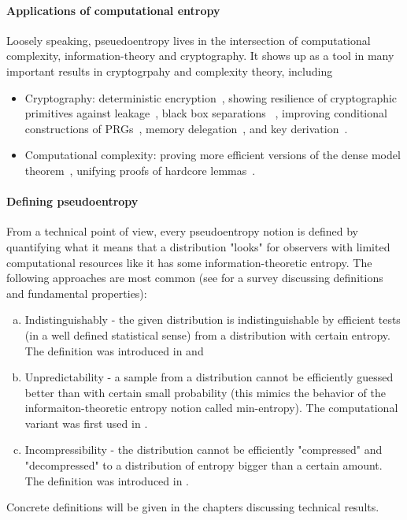 \documentclass[12pt]{report}
\begin{document}
\paragraph{Applications of computational entropy}
Loosely speaking, pseuedoentropy lives in the intersection of computational complexity, information-theory and cryptography. It shows up as a tool in many important results in cryptogrpahy and complexity theory, including
\begin{itemize}
\item Cryptography: deterministic encryption~\cite{DBLP:conf/tcc/FullerOR12},
showing resilience of cryptographic primitives against leakage~\cite{DBLP:conf/focs/DziembowskiP08,DBLP:conf/eurocrypt/Pietrzak09}, black box separations
~\cite{DBLP:conf/stoc/GentryW11}, improving conditional constructions of PRGs~\cite{DBLP:conf/stoc/VadhanZ12},
 memory delegation~\cite{DBLP:conf/crypto/ChungKLR11}, and key derivation~\cite{DBLP:conf/icalp/SkorskiGP15}.
\item Computational complexity: proving more efficient versions of the dense model theorem~\cite{DBLP:conf/focs/ReingoldTTV08,DBLP:journals/eccc/Zhang11}, unifying proofs
of hardcore lemmas~\cite{DBLP:conf/icits/Skorski15a}.
\end{itemize}
 

\paragraph{Defining pseudoentropy}
From a technical point of view, every pseudoentropy notion is defined by quantifying what it means that
a distribution "looks" for observers with limited computational resources like it has some information-theoretic entropy.
The following approaches are most common (see \cite{DBLP:conf/icits/Reyzin11} for a survey discussing definitions and fundamental properties):
\begin{enumerate}[(a)]
    \item Indistinguishably - the given distribution is indistinguishable by efficient tests
    (in a well defined statistical sense) from a distribution with certain entropy. The definition was introduced in \cite{DBLP:journals/siamcomp/HastadILL99} and \cite{DBLP:conf/random/BarakSW03}
    \item Unpredictability - a sample from a distribution cannot be efficiently guessed
    better than with certain small probability (this mimics the behavior of the informaiton-theoretic entropy notion called min-entropy). The computational variant was first used in \cite{DBLP:conf/eurocrypt/HsiaoLR07}.
   \item Incompressibility - the distribution cannot be efficiently "compressed" and "decompressed" to a distribution of 
   entropy bigger than a certain amount. The definition was introduced in \cite{DBLP:conf/random/BarakSW03}.
\end{enumerate}
Concrete definitions will be given in the chapters discussing technical results.
\end{document}
